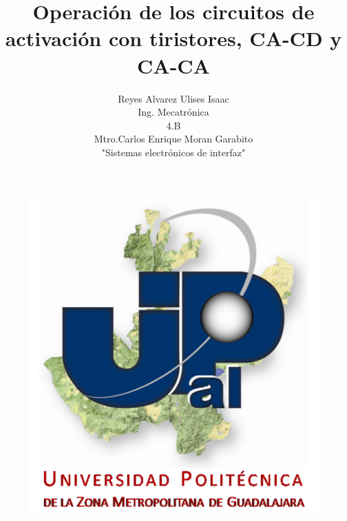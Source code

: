 \documentclass[12pt,a4paper]{article}
\author{Reyes Alvarez Ulises Isaac\\ Ing. Mecatrónica\\4.B\\Mtro.Carlos Enrique Moran Garabito\\"Sistemas electrónicos de interfaz"}
\title{Operación de los circuitos de activación con tiristores, CA-CD y CA-CA}
\begin{document}
\maketitle
\begin{figure}[hbtp] 
\centering
\includegraphics[scale=1.5]{Universidad.png}
\end{figure}

\newpage
\end{document}
